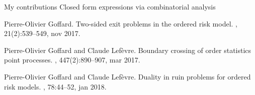 \documentclass{beamer}
\begin{document}
\begin{frame}{My contributions}
Closed form expressions via combinatorial analysis 
\tiny
\begin{thebibliography}{1}

Pierre-Olivier Goffard.
\newblock Two-sided exit problems in the ordered risk model.
,
  21(2):539--549, nov 2017.

Pierre-Olivier Goffard and Claude Lef{\`{e}}vre.
\newblock Boundary crossing of order statistics point processes.
,
  447(2):890--907, mar 2017.

Pierre-Olivier Goffard and Claude Lef{\`{e}}vre.
\newblock Duality in ruin problems for ordered risk models.
, 78:44--52, jan 2018.

\end{thebibliography}

\end{frame}
\end{document}
